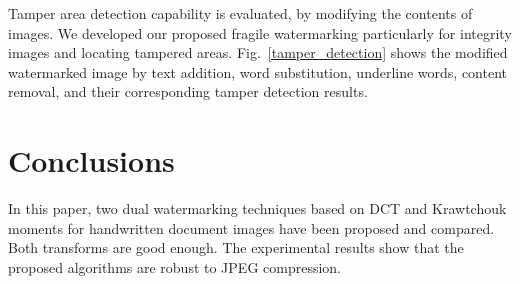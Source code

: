 \documentclass[runningheads]{llncs}
\begin{document}
Tamper area detection capability is evaluated, by modifying the contents of images. We developed our proposed fragile watermarking particularly for integrity images and locating tampered areas. Fig.~\ref{tamper_detection} shows the modified watermarked image by text addition, word substitution, underline words, content removal, and their corresponding tamper detection results.

\section{Conclusions}
In this paper, two dual watermarking techniques based on DCT and Krawtchouk moments for handwritten document images have been proposed and compared. Both transforms are good enough. The experimental results show that the proposed algorithms are robust to JPEG compression.

%
%


%
\end{document}
